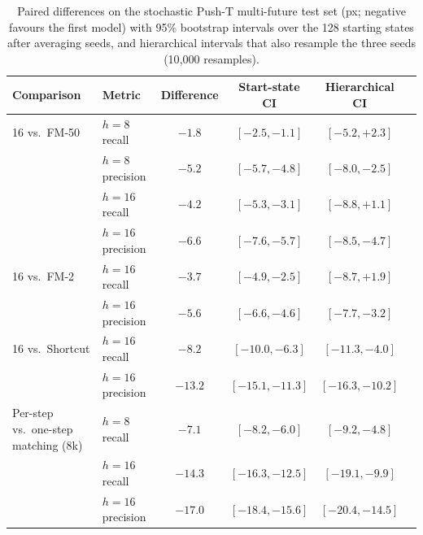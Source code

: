 \begin{table}[h]
\caption{Paired differences on the stochastic Push-T multi-future test set (px; negative favours the first model) with 95\% bootstrap intervals over the 128 starting states after averaging seeds, and hierarchical intervals that also resample the three seeds (10{,}000 resamples).}
\label{tab:bci}
\begin{center}
\small
\begin{tabular}{llcccc}
\toprule
Comparison & Metric & Difference & Start-state CI & Hierarchical CI \\
\midrule
\imlewm{} 16 vs.\ FM-50 & $h{=}8$ recall & $-1.8$ & $[-2.5, -1.1]$ & $[-5.2, +2.3]$ \\
 & $h{=}8$ precision & $-5.2$ & $[-5.7, -4.8]$ & $[-8.0, -2.5]$ \\
 & $h{=}16$ recall & $-4.2$ & $[-5.3, -3.1]$ & $[-8.8, +1.1]$ \\
 & $h{=}16$ precision & $-6.6$ & $[-7.6, -5.7]$ & $[-8.5, -4.7]$ \\
\imlewm{} 16 vs.\ FM-2 & $h{=}16$ recall & $-3.7$ & $[-4.9, -2.5]$ & $[-8.7, +1.9]$ \\
 & $h{=}16$ precision & $-5.6$ & $[-6.6, -4.6]$ & $[-7.7, -3.2]$ \\
\imlewm{} 16 vs.\ Shortcut & $h{=}16$ recall & $-8.2$ & $[-10.0, -6.3]$ & $[-11.3, -4.0]$ \\
 & $h{=}16$ precision & $-13.2$ & $[-15.1, -11.3]$ & $[-16.3, -10.2]$ \\
Per-step vs.\ one-step matching (8k) & $h{=}8$ recall & $-7.1$ & $[-8.2, -6.0]$ & $[-9.2, -4.8]$ \\
 & $h{=}16$ recall & $-14.3$ & $[-16.3, -12.5]$ & $[-19.1, -9.9]$ \\
 & $h{=}16$ precision & $-17.0$ & $[-18.4, -15.6]$ & $[-20.4, -14.5]$ \\
\bottomrule
\end{tabular}
\end{center}
\end{table}


